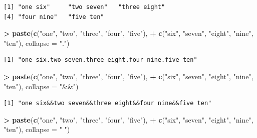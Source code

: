 \documentclass[
]{krantz}
\makeatletter
\newenvironment{Shaded}{\begin{snugshade}}{\end{snugshade}}
\newcommand{\DataTypeTok}[1]{\textcolor[rgb]{0.27,0.27,0.27}{#1}}
\newcommand{\KeywordTok}[1]{\textcolor[rgb]{0.27,0.27,0.27}{\textbf{#1}}}
\newcommand{\NormalTok}[1]{#1}
\newcommand{\OperatorTok}[1]{\textcolor[rgb]{0.43,0.43,0.43}{\textbf{#1}}}
\newcommand{\StringTok}[1]{\textcolor[rgb]{0.5,0.5,0.5}{#1}}
\newenvironment{kframe}{%
\medskip{}
\setlength{\fboxsep}{.8em}
 \def\at@end@of@kframe{}%
 \ifinner\ifhmode%
  \def\at@end@of@kframe{\end{minipage}}%
  \begin{minipage}{\columnwidth}%
 \fi\fi%
 \def\FrameCommand##1{\hskip\@totalleftmargin \hskip-\fboxsep
 \colorbox{shadecolor}{##1}\hskip-\fboxsep
     \hskip-\linewidth \hskip-\@totalleftmargin \hskip\columnwidth}%
 \MakeFramed {\advance\hsize-\width
   \@totalleftmargin\z@ \linewidth\hsize
   \@setminipage}}%
 {\par\unskip\endMakeFramed%
 \at@end@of@kframe}
\renewenvironment{Shaded}{\begin{kframe}}{\end{kframe}}
\makeatother
\begin{document}
\begin{verbatim}
[1] "one six"     "two seven"   "three eight"
[4] "four nine"   "five ten"   
\end{verbatim}

\begin{Shaded}
\begin{Highlighting}[]
\OperatorTok{\textgreater{}}\StringTok{ }\KeywordTok{paste}\NormalTok{(}\KeywordTok{c}\NormalTok{(}\StringTok{"one"}\NormalTok{, }\StringTok{"two"}\NormalTok{, }\StringTok{"three"}\NormalTok{, }\StringTok{"four"}\NormalTok{, }\StringTok{"five"}\NormalTok{), }
\OperatorTok{+}\StringTok{       }\KeywordTok{c}\NormalTok{(}\StringTok{"six"}\NormalTok{, }\StringTok{"seven"}\NormalTok{, }\StringTok{"eight"}\NormalTok{, }\StringTok{"nine"}\NormalTok{, }\StringTok{"ten"}\NormalTok{), }\DataTypeTok{collapse =} \StringTok{"."}\NormalTok{)}
\end{Highlighting}
\end{Shaded}

\begin{verbatim}
[1] "one six.two seven.three eight.four nine.five ten"
\end{verbatim}

\begin{Shaded}
\begin{Highlighting}[]
\OperatorTok{\textgreater{}}\StringTok{ }\KeywordTok{paste}\NormalTok{(}\KeywordTok{c}\NormalTok{(}\StringTok{"one"}\NormalTok{, }\StringTok{"two"}\NormalTok{, }\StringTok{"three"}\NormalTok{, }\StringTok{"four"}\NormalTok{, }\StringTok{"five"}\NormalTok{),  }
\OperatorTok{+}\StringTok{       }\KeywordTok{c}\NormalTok{(}\StringTok{"six"}\NormalTok{, }\StringTok{"seven"}\NormalTok{, }\StringTok{"eight"}\NormalTok{, }\StringTok{"nine"}\NormalTok{, }\StringTok{"ten"}\NormalTok{), }\DataTypeTok{collapse =} \StringTok{"\&\&"}\NormalTok{)}
\end{Highlighting}
\end{Shaded}

\begin{verbatim}
[1] "one six&&two seven&&three eight&&four nine&&five ten"
\end{verbatim}

\begin{Shaded}
\begin{Highlighting}[]
\OperatorTok{\textgreater{}}\StringTok{ }\KeywordTok{paste}\NormalTok{(}\KeywordTok{c}\NormalTok{(}\StringTok{"one"}\NormalTok{, }\StringTok{"two"}\NormalTok{, }\StringTok{"three"}\NormalTok{, }\StringTok{"four"}\NormalTok{, }\StringTok{"five"}\NormalTok{),}
\OperatorTok{+}\StringTok{       }\KeywordTok{c}\NormalTok{(}\StringTok{"six"}\NormalTok{, }\StringTok{"seven"}\NormalTok{, }\StringTok{"eight"}\NormalTok{, }\StringTok{"nine"}\NormalTok{, }\StringTok{"ten"}\NormalTok{), }\DataTypeTok{collapse =} \StringTok{" "}\NormalTok{)}
\end{Highlighting}
\end{Shaded}
\end{document}
